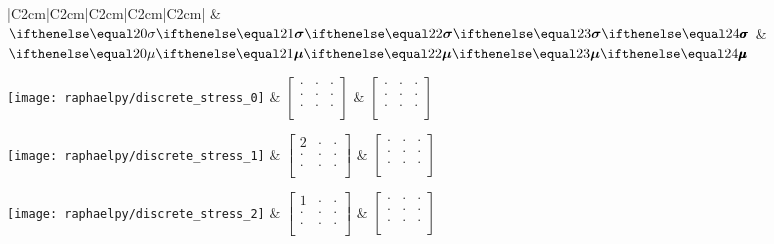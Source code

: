 \begin{table}
	\centering
	\caption{2D illustrations of stress and couple stress tensors}
	\def\w{2cm}
	\def\z{\cdot}
	\begin{tabular}{|C{2cm}|C{2cm}|C{2cm}|C{2cm}|C{2cm}|}
		\hline
		{} & $\stressTensor$ & $\coupleStressTensor$ \\
		\hline
		\hline

		\texttt{[image: raphaelpy/discrete\_stress\_0]}
		&
		$\begin{bmatrix}
			\z & \z & \z \\
			\z & \z & \z \\
			\z & \z & \z \\
		\end{bmatrix}$
		&
		$\begin{bmatrix}
			\z & \z & \z \\
			\z & \z & \z \\
			\z & \z & \z \\
		\end{bmatrix}$
		\\
		\hline

		\texttt{[image: raphaelpy/discrete\_stress\_1]}
		&
		$\begin{bmatrix}
			 2 & \z & \z \\
			\z & \z & \z \\
			\z & \z & \z \\
		\end{bmatrix}$
		&
		$\begin{bmatrix}
			\z & \z & \z \\
			\z & \z & \z \\
			\z & \z & \z \\
		\end{bmatrix}$
		\\
		\hline

		\texttt{[image: raphaelpy/discrete\_stress\_2]}
		&
		$\begin{bmatrix}
			 1 & \z & \z \\
			\z & \z & \z \\
			\z & \z & \z \\
		\end{bmatrix}$
		&
		$\begin{bmatrix}
			\z & \z & \z \\
			\z & \z & \z \\
			\z & \z & \z \\
		\end{bmatrix}$
		\\
		\hline


\end{tabular}
\end{table}

